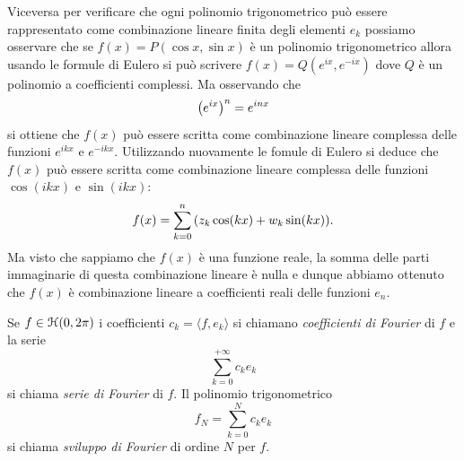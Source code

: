 Viceversa per verificare che ogni polinomio trigonometrico può essere rappresentato
come combinazione lineare finita degli elementi $e_k$
possiamo osservare che se $f(x) = P(\cos x,\sin x)$ è un polinomio trigonometrico
allora usando le formule di Eulero si può scrivere $f(x) = Q(e^{ix}, e^{-ix})$
dove $Q$ è un polinomio a coefficienti complessi. Ma osservando che
\[
  {\left( e^{ix} \right)}^n = e^{inx}
\]
si ottiene che $f(x)$ può essere scritta come combinazione lineare complessa
delle funzioni $e^{ikx}$ e $e^{-ikx}$. Utilizzando nuovamente le fomule di
Eulero si deduce che $f(x)$ può essere scritta come combinazione lineare
complessa delle funzioni $\cos(ikx)$ e $\sin(ikx)$:
\[
  f(x) = \sum_{k=0}^n {\left( z_k \cos(kx) + w_k \sin(kx) \right)}.
\]
Ma visto che sappiamo che $f(x)$ è una funzione reale, la somma delle parti
immaginarie di questa combinazione lineare è nulla e dunque abbiamo ottenuto
che $f(x)$ è combinazione lineare a coefficienti reali
delle funzioni $e_n$.

\begin{definition}
Se $f\in \mathcal H(0,2\pi)$ i coefficienti $c_k = \langle f, e_k\rangle$
si chiamano \emph{coefficienti di Fourier}%
 di $f$
e la serie
\[
  \sum_{k=0}^{+\infty} c_k e_k
\]
si chiama \emph{serie di Fourier}%
 di $f$.
Il polinomio trigonometrico
\[
  f_N = \sum_{k=0}^{N} c_k e_k
\]
si chiama \emph{sviluppo di Fourier}%
 di ordine $N$ per $f$.
\end{definition}

